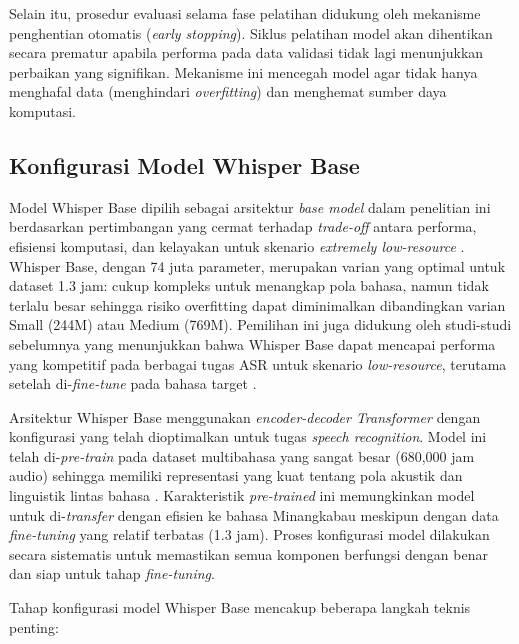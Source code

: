Selain itu, prosedur evaluasi selama fase pelatihan didukung oleh mekanisme penghentian otomatis (\textit{early stopping}). Siklus pelatihan model akan dihentikan secara prematur apabila performa pada data validasi tidak lagi menunjukkan perbaikan yang signifikan. Mekanisme ini mencegah model agar tidak hanya menghafal data (menghindari \textit{overfitting}) dan menghemat sumber daya komputasi.

\subsection{Konfigurasi Model Whisper Base}
\label{III.Langkah5}

Model Whisper Base dipilih sebagai arsitektur \textit{base model} dalam penelitian ini berdasarkan pertimbangan yang cermat terhadap \textit{trade-off} antara performa, efisiensi komputasi, dan kelayakan untuk skenario \textit{extremely low-resource} \cite{radford2023whisper}. Whisper Base, dengan 74 juta parameter, merupakan varian yang optimal untuk dataset 1.3 jam: cukup kompleks untuk menangkap pola bahasa, namun tidak terlalu besar sehingga risiko overfitting dapat diminimalkan dibandingkan varian Small (244M) atau Medium (769M). Pemilihan ini juga didukung oleh studi-studi sebelumnya yang menunjukkan bahwa Whisper Base dapat mencapai performa yang kompetitif pada berbagai tugas ASR untuk skenario \textit{low-resource}, terutama setelah di-\textit{fine-tune} pada bahasa target \cite{liu2024exploration,timmel2024finetune}.

Arsitektur Whisper Base menggunakan \textit{encoder-decoder Transformer} \cite{vaswani2017attention,radford2023whisper} dengan konfigurasi yang telah dioptimalkan untuk tugas \textit{speech recognition}. Model ini telah di-\textit{pre-train} pada dataset multibahasa yang sangat besar (680,000 jam audio) sehingga memiliki representasi yang kuat tentang pola akustik dan linguistik lintas bahasa \cite{radford2023whisper}. Karakteristik \textit{pre-trained} ini memungkinkan model untuk di-\textit{transfer} dengan efisien ke bahasa Minangkabau meskipun dengan data \textit{fine-tuning} yang relatif terbatas (1.3 jam). Proses konfigurasi model dilakukan secara sistematis untuk memastikan semua komponen berfungsi dengan benar dan siap untuk tahap \textit{fine-tuning}.

Tahap konfigurasi model Whisper Base mencakup beberapa langkah teknis penting:

